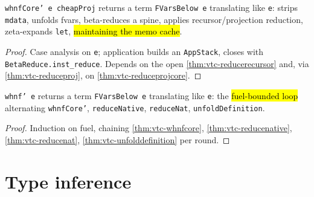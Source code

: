 \begin{theorem}
  \label{thm:vtc-whnfcore}
  \leanok

   \texttt{whnfCore' e cheapProj} returns a term \texttt{FVarsBelow e}
  translating like \texttt{e}: strips \texttt{mdata}, unfolds fvars, beta-reduces a spine,
  applies recursor/projection reduction, zeta-expands \texttt{let}, \hl{maintaining the memo
  cache}.
\end{theorem}
\begin{proof}
  \leanok
   Case analysis on \texttt{e}; application builds an \texttt{AppStack}, closes with
  \texttt{BetaReduce.inst\_reduce}. Depends on the open
  \ref{thm:vtc-reducerecursor} and, via \ref{thm:vtc-reduceproj}, on
  \ref{thm:vtc-reduceprojcore}.
\end{proof}

\begin{theorem}
  \label{thm:vtc-whnf}
  \leanok

   \texttt{whnf' e} returns a term \texttt{FVarsBelow e} translating like
  \texttt{e}: the \hl{fuel-bounded loop} alternating \texttt{whnfCore'}, \texttt{reduceNative},
  \texttt{reduceNat}, \texttt{unfoldDefinition}.
\end{theorem}
\begin{proof}
  \leanok
   Induction on fuel, chaining \ref{thm:vtc-whnfcore},
  \ref{thm:vtc-reducenative}, \ref{thm:vtc-reducenat}, \ref{thm:vtc-unfolddefinition} per round.
\end{proof}

\section{Type inference}

